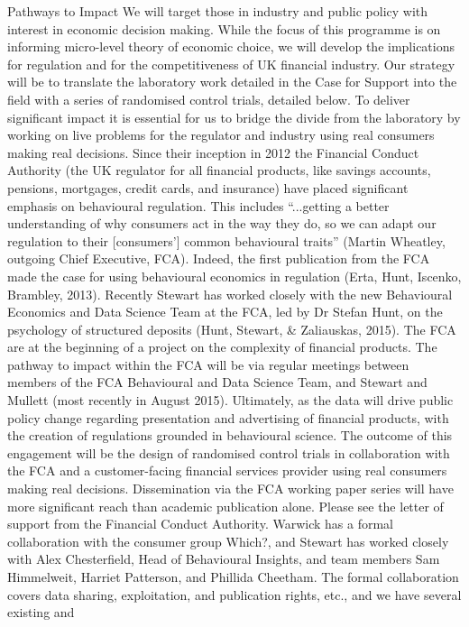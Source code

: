 \documentclass[11pt, a4paper]{article}
\begin{document}
Pathways to Impact
We will target those in industry and public policy with interest in economic decision making.
While the focus of this programme is on informing micro-level theory of economic choice,
we will develop the implications for regulation and for the competitiveness of UK financial
industry. Our strategy will be to translate the laboratory work detailed in the Case for Support
into the field with a series of randomised control trials, detailed below. To deliver significant
impact it is essential for us to bridge the divide from the laboratory by working on live
problems for the regulator and industry using real consumers making real decisions.
Since their inception in 2012 the Financial Conduct Authority (the UK regulator for all
financial products, like savings accounts, pensions, mortgages, credit cards, and insurance)
have placed significant emphasis on behavioural regulation. This includes “...getting a better
understanding of why consumers act in the way they do, so we can adapt our regulation to
their [consumers’] common behavioural traits” (Martin Wheatley, outgoing Chief Executive,
FCA). Indeed, the first publication from the FCA made the case for using behavioural
economics in regulation (Erta, Hunt, Iscenko, Brambley, 2013). Recently Stewart has worked
closely with the new Behavioural Economics and Data Science Team at the FCA, led by Dr
Stefan Hunt, on the psychology of structured deposits (Hunt, Stewart, \& Zaliauskas, 2015).
The FCA are at the beginning of a project on the complexity of financial products. The
pathway to impact within the FCA will be via regular meetings between members of the FCA
Behavioural and Data Science Team, and Stewart and Mullett (most recently in August 2015).
Ultimately, as the data will drive public policy change regarding presentation and advertising
of financial products, with the creation of regulations grounded in behavioural science. The
outcome of this engagement will be the design of randomised control trials in collaboration
with the FCA and a customer-facing financial services provider using real consumers making
real decisions. Dissemination via the FCA working paper series will have more significant
reach than academic publication alone. Please see the letter of support from the Financial
Conduct Authority.
Warwick has a formal collaboration with the consumer group Which?, and Stewart has
worked closely with Alex Chesterfield, Head of Behavioural Insights, and team members
Sam Himmelweit, Harriet Patterson, and Phillida Cheetham. The formal collaboration covers
data sharing, exploitation, and publication rights, etc., and we have several existing and
\end{document}

